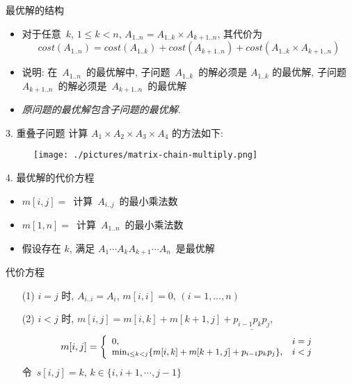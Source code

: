 \documentclass[fontset=fandol,UTF8,fleqn]{beamer}
\begin{document}
\begin{frame}{最优解的结构}
  \begin{itemize}[<+-|alert@+>]
\item  对于任意~$k$, $1\leq k < n$, $A_{1..n}=A_{1..k}\times A_{k+1..n}$, 其代价为 
\small{
 \begin{displaymath}
   cost(A_{1..n})=cost(A_{1..k})+cost(A_{k+1..n})+cost(A_{1..k}\times A_{k+1..n}) 
 \end{displaymath}
}

\item 说明: 在~$A_{1..n}$~的最优解中, 子问题~$A_{1..k}$~的解必须是 $A_{1..k}$ 的最优解, 子问题~$A_{k+1..n}$~的解必须是~$A_{k+1..n}$~的最优解  
\item \emph{原问题的最优解包含子问题的最优解}.   
\end{itemize}
\end{frame}

\begin{frame}{3. 重叠子问题}
计算 $A_1\times A_2 \times A_3 \times A_4$ 的方法如下: 
\begin{figure}
  \centering
  \texttt{[image: ./pictures/matrix-chain-multiply.png]}%
\end{figure}
\end{frame}

\begin{frame}{4. 最优解的代价方程}
  \begin{itemize}[<+-|alert@+>]
\item $m[i,j]=$~计算~$A_{i..j}$~的最小乘法数   
\item $m[1,n]=$~计算~$A_{1..n}$~的最小乘法数  
\item 假设存在 $k$, 满足 $A_1\cdots A_kA_{k+1}\cdots A_n$~是最优解  
\end{itemize}
\end{frame}

\begin{frame}{代价方程}
  \begin{itemize}[<+-|alert@+>]
\item[(1)] $i = j$ 时, $A_{i..i}=A_i$, $m[i,i]=0$, $(i=1,\ldots, n)$ 
\item[(2)] $i<j$ 时,  $m[i,j]=m[i,k]+m[k+1,j]+\underline{p_{i-1}p_kp_j}$,  
\begin{eqnarray*}
\small{
  \label{eq:step2}
  m[i,j]=\left\{\begin{array}{ll}
0, & i = j\\
\mathrm{min}_{i\leq k< j}\{m[i,k]+m[k+1,j]+p_{i-1}p_kp_j\}, &
i<j
\end{array}\right.} 
\end{eqnarray*}
令~$s[i,j]=k$, $k \in \{i, i+1, \cdots, j-1\}$  
\end{itemize}
\end{frame}
\end{document}
